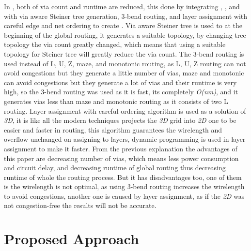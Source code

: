 \documentclass[conference]{IEEEtran}
\begin{document}
\par
In \cite{b4}, both of via count and runtime are reduced, this done by integrating \cite{b10}, \cite{b11}, and \cite{b12} with via aware Steiner tree generation, 3-bend routing, and layer assignment with careful edge and net ordering to create \cite{b4}. Via aware Steiner tree is used to at the beginning of the global routing, it generates a suitable topology, by changing tree topology the via count greatly changed, which means that using a suitable topology for Steiner tree will greatly reduce the via count. The 3-bend routing is used instead of L, U, Z, maze, and monotonic routing, as L, U, Z routing can not avoid congestions but they generate a little number of vias, maze and monotonic can avoid congestions but they generate a lot of vias and their runtime is very high, so the 3-bend routing was used as it is fast, its completely \textit{O(nm)}, and it generates vias less than maze and monotonic routing as it consists of two L routing. Layer assignment with careful ordering algorithm is used as a solution of \textit{3D}, it is like all the modern techniques projects the \textit{3D} grid into \textit{2D} one to be easier and faster in routing, this algorithm guarantees the wirelength and overflow unchanged on assigning to layers, dynamic programming is used in layer assignment to make it faster. From the previous explanation the advantages of this paper are decreasing number of vias, which means less power consumption and circuit delay, and decreasing runtime of global routing thus decreasing runtime of whole the routing process. But it has disadvantages too, one of them is the wirelength is not optimal, as using 3-bend routing increases the wirelength to avoid congestions, another one is caused by layer assignment, as if the \textit{2D} was not congestion-free the results will not be accurate.



\section{Proposed Approach}
\end{document}
